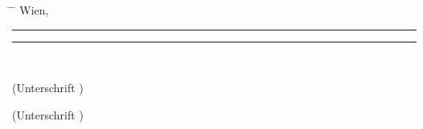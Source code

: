 \begin{center}
   \begin{minipage}[t][2cm][t]{\textwidth}
      \vspace{0pt}\sffamily\thesistitlefontnormalsize
      \begin{tabbing}
         \hspace{45mm} \= \hspace{65mm} \= \hspace{65mm} \kill
         Wien, \tuinfthesisdate \> {\raggedright\rule{50mm}{0.5pt}} \> 
                                   {\raggedright\rule{50mm}{0.5pt}} \\
         \> \begin{minipage}[t][0.5cm][t]{50mm}
               \centering (Unterschrift \tuinfthesisverfassung)
            \end{minipage}
         \> \begin{minipage}[t][0.5cm][t]{50mm}
               \centering (Unterschrift \tuinfthesisbetreuung)
            \end{minipage}
      \end{tabbing}
   \end{minipage}
\end{center}

\pagestyle{empty}
\cleardoublepage



%
%
%
%
\thispagestyle{tuinftitlepage}

